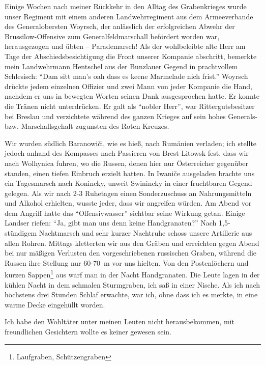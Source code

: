 \documentclass[a5paper,pagesize,10pt,twoside=true]{scrbook}
\begin{document}
Einige Wochen nach meiner Rückkehr in den Alltag des Grabenkrieges wurde unser Regiment mit einem anderen Landwehrregiment aus dem Armeeverbande des Generalobersten Woyrsch, der anlässlich der erfolgreichen Abwehr der Brussilow-Offensive zum Generalfeldmarschall befördert worden war, herausgezogen und übten -- Parademarsch! Als der wohlbeleibte alte Herr am Tage der Abschiedsbesichtigung die Front unserer Kompanie abschritt, bemerkte mein Landwehrmann Hentschel aus der Bunzlauer Gegend in prachtvollem Schlesisch: \enquote{Dam sitt man's oah dass es keene Marmelade nich frist.} Woyrsch drückte jedem einzelnen Offizier und zwei Mann von jeder Kompanie die Hand, nachdem er uns in bewegten Worten seinen Dank ausgesprochen hatte. Er konnte die Tränen nicht unterdrücken. Er galt als \enquote{nobler Herr}, war Rittergutsbesitzer bei Breslau und verzichtete während des ganzen Krieges auf sein hohes Generals- bzw. Marschallsgehalt zugunsten des Roten Kreuzes.

Wir wurden südlich Baranowiči, wie es hieß, nach Rumänien verladen; ich stellte jedoch anhand des Kompasses nach Passieren von Brest-Litowsk fest, dass wir nach Wolhynica fuhren, wo die Russen, denen hier nur Österreicher gegenüber standen, einen tiefen Einbruch erzielt hatten. In Iwaniče ausgeladen brachte uns ein Tagesmarsch nach Konincky, unweit Swinincky in einer fruchtbaren Gegend gelegen. Als wir nach 2-3 Ruhetagen einen Sonderzuschuss an Nahrungsmitteln und Alkohol erhielten, wusste jeder, dass wir angreifen würden. Am Abend vor dem Angriff hatte das \enquote{Offensivwasser} sichtbar seine Wirkung getan. Einige Landser riefen: \enquote{Ja, gibt man uns denn keine Handgranaten?} Nach 1,5-stündigem Nachtmarsch und sehr kurzer Nachtruhe schoss unsere Artillerie aus allen Rohren. Mittags kletterten wir aus den Gräben und erreichten gegen Abend bei nur mäßigen Verlusten den vorgeschriebenen russischen Graben, während die Russen ihre Stellung nur 60-70~m vor uns hielten. Von den Postenlöchern und kurzen Sappen\footnote{Laufgraben, Schützengraben} aus warf man in der Nacht Handgranaten. Die Leute lagen in der kühlen Nacht in dem schmalen Sturmgraben, ich saß in einer Nische. Als ich nach höchstens drei Stunden Schlaf erwachte, war ich, ohne dass ich es merkte, in eine warme Decke eingehüllt worden.

Ich habe den Wohltäter unter meinen Leuten nicht herausbekommen, mit freundlichen Gesichtern wollte es keiner gewesen sein.
\end{document}
